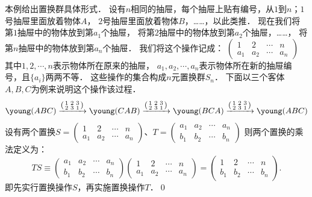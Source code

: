 \begin{example}\label{chtop:exm_ZhiHuanQun}
    本例给出置换群具体形式．
    设有$n$相同的抽屉，每个抽屉上贴有编号，从$1$到$n$；$1$号抽屉里面放着物体$A$，
    $2$号抽屉里面放着物体$B$，……，以此类推．
    现在我们将第$1$抽屉中的物体放到第$a_1$个抽屉，
    将第$2$抽屉中的物体放到第$a_2$个抽屉，……，
    将第$n$抽屉中的物体放到第$a_n$个抽屉．
    我们将这个操作记成：
    $(\begin{smallmatrix}
    	1 &2 &\cdots &n \\  a_1 &a_2 &\cdots &a_n
    \end{smallmatrix} )$
    其中$1, 2, \cdots, n$表示物体所在原来的抽屉，
    $a_1, a_2, \cdots, a_n $表示物体所在新的抽屉编号，且$\{a_i\}$两两不等．
    这些操作的集合构成$n$元{\kaishu 置换群}$S_n$．
    下面以三个客体$A,B,C$为例来说明这个操作该过程．
    \begin{equation*}
        \young(ABC) \xrightarrow{\left(\begin{smallmatrix}
                1 &2 &3 \\  2 & 3 & 1  \end{smallmatrix} \right)}
        \young(CAB) \xrightarrow{\left(\begin{smallmatrix}
                1 &2 &3 \\  2 & 3 & 1  \end{smallmatrix} \right)}
        \young(BCA) \xrightarrow{\left(\begin{smallmatrix}
                1 &2 &3 \\  2 & 3 & 1  \end{smallmatrix} \right)}
        \young(ABC)
    \end{equation*}
    设有两个置换$S=(\begin{smallmatrix}
    	1 &2 &\cdots &n \\  a_1 &a_2 &\cdots &a_n
    \end{smallmatrix} )$、$T=(\begin{smallmatrix}
    a_1 &a_2 &\cdots &a_n \\ b_1 &b_2 &\cdots &b_n 
    \end{smallmatrix} )$
    则两个置换的乘法定义为：
    \begin{equation*}
    	TS\equiv 
    	\begin{pmatrix} a_1 &a_2 &\cdots &a_n \\ b_1 &b_2 &\cdots &b_n \end{pmatrix}
    	\begin{pmatrix} 1 &2 &\cdots &n \\  a_1 &a_2 &\cdots &a_n \end{pmatrix}
    	=\begin{pmatrix} 1 &2 &\cdots &n \\  b_1 &b_2 &\cdots &b_n \end{pmatrix} .
    \end{equation*}
    即先实行置换操作$S$，再实施置换操作$T$．\qed
\end{example}

